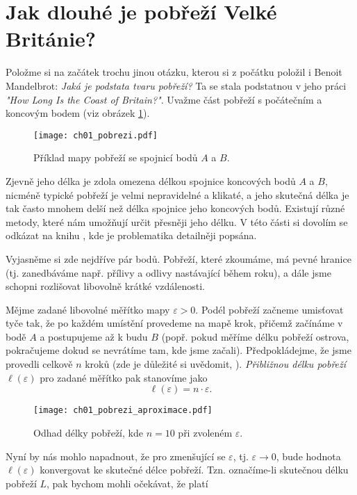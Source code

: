 \section{Jak dlouhé je pobřeží Velké Británie?}\label{sec:pobrezi_velke_britanie}
Položme si na začátek trochu jinou otázku, kterou si z počátku položil i Benoit Mandelbrot: \emph{Jaká je podstata tvaru pobřeží?} Ta se stala podstatnou v jeho práci \emph{"How Long Is the Coast of Britain?"}. Uvažme část pobřeží s počátečním a koncovým bodem (viz obrázek \ref{fig:pobrezi}).
\begin{figure}[h]
    \centering
    \texttt{[image: ch01\_pobrezi.pdf]}
    \caption{Příklad mapy pobřeží se spojnicí bodů $A$ a $B$.}
    \label{fig:pobrezi}
\end{figure}
Zjevně jeho délka je zdola omezena délkou spojnice koncových bodů $A$ a $B$, nicméně typické pobřeží je velmi nepravidelné a klikaté, a jeho skutečná délka je tak často mnohem delší než délka spojnice jeho koncových bodů. Existují různé metody, které nám umožňují určit přesněji jeho délku. V této části si dovolím se odkázat na knihu \citep[str. 79]{Mandelbrot1983}, kde je problematika detailněji popsána.\par
Vyjasněme si zde nejdříve pár bodů. Pobřeží, které zkoumáme, má pevné hranice (tj. zanedbáváme např. přílivy a odlivy nastávající během roku), a dále jsme schopni rozlišovat libovolně krátké vzdálenosti.\par
Mějme zadané libovolné měřítko mapy $\varepsilon>0$. Podél pobřeží začneme umisťovat tyče tak, že po každém umístění provedeme na mapě krok, přičemž začínáme v bodě $A$ a postupujeme až k budu $B$ (popř. pokud měříme délku pobřeží ostrova, pokračujeme dokud se nevrátíme tam, kde jsme začali). Předpokládejme, že jsme provedli celkově $n$ kroků (zde je důležité si uvědomit, ). \emph{Přibližnou délku pobřeží} $\ell(\varepsilon)$ pro zadané měřítko pak stanovíme jako
\begin{equation*}
    \ell(\varepsilon)=n\cdot\varepsilon.
\end{equation*}
\begin{figure}[h]
    \centering
    \texttt{[image: ch01\_pobrezi\_aproximace.pdf]}
    \caption{Odhad délky pobřeží, kde $n=10$ při zvoleném $\varepsilon$.}
    \label{fig:pobrezi_aproximace}
\end{figure}
Nyní by nás mohlo napadnout, že pro zmenšující se $\varepsilon$, tj. $\varepsilon\to0$, bude hodnota $\ell(\varepsilon)$ konvergovat ke skutečné délce pobřeží. Tzn. označíme-li skutečnou délku pobřeží $L$, pak bychom mohli očekávat, že platí
